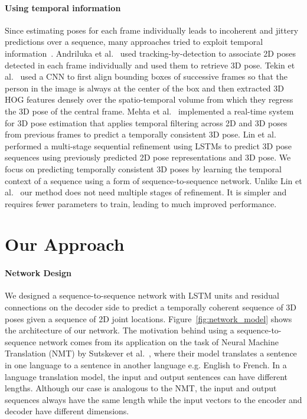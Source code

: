 \documentclass[runningheads]{llncs}
\begin{document}
\paragraph{Using temporal information}
Since estimating poses for each frame individually leads to incoherent and jittery predictions over a sequence, many approaches tried to exploit temporal information~\cite{andriluka2010monocular,tekin2016direct,zhou2016sparseness,du2016marker,mehta2017vnect}. Andriluka et al.~\cite{andriluka2010monocular} used tracking-by-detection to associate 2D poses detected in each frame individually and used them to retrieve 3D pose. Tekin et al.~\cite{tekin2016direct} used a CNN to first align bounding boxes of successive frames so that the person in the image is always at the center of the box and then extracted 3D HOG features densely over the spatio-temporal volume from which they regress the 3D pose of the central frame. Mehta et al.~\cite{mehta2017vnect} implemented a real-time system for 3D pose estimation that applies temporal filtering across 2D and 3D poses from previous frames to predict a temporally consistent 3D pose. Lin et al.~\cite{linCVPR17RPSM} performed a multi-stage sequential refinement using LSTMs to predict 3D pose sequences using previously predicted 2D pose representations and 3D pose. We focus on predicting temporally consistent 3D poses by learning the temporal context of a sequence using a form of sequence-to-sequence network. Unlike Lin et al.~\cite{linCVPR17RPSM} our method does not need multiple stages of refinement. It is simpler and requires fewer parameters to train, leading to much improved performance. 

\section{Our Approach}
\paragraph{Network Design}
We designed a sequence-to-sequence network with LSTM units and residual connections on the decoder side to predict a temporally coherent sequence of 3D poses given a sequence of 2D joint locations. Figure~\ref{fig:network_model} shows the architecture of our network. The motivation behind using a sequence-to-sequence network comes from its application on the task of Neural Machine Translation (NMT) by Sutskever  et al.~\cite{sutskever2014sequence}, where their model translates a sentence in one language to a sentence in another language e.g. English to French. In a language translation model, the input and output sentences can have different lengths. Although our case is analogous to the NMT, the input and output sequences always have the same length while the input vectors to the encoder and decoder have different dimensions.
\end{document}
